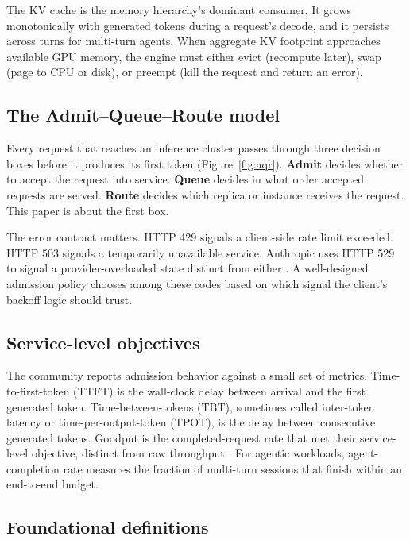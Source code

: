 \documentclass[11pt,letterpaper]{article}
\theoremstyle{definition}
\begin{document}
The KV cache is the memory hierarchy's dominant consumer. It grows
monotonically with generated tokens during a request's decode, and it
persists across turns for multi-turn agents. When aggregate KV
footprint approaches available GPU memory, the engine must either
evict (recompute later), swap (page to CPU or disk), or preempt (kill
the request and return an error).

\subsection{The Admit--Queue--Route model}

Every request that reaches an inference cluster passes through three
decision boxes before it produces its first token
(Figure~\ref{fig:aqr}). \textbf{Admit} decides whether to accept the
request into service. \textbf{Queue} decides in what order accepted
requests are served. \textbf{Route} decides which replica or instance
receives the request. This paper is about the first box.

The error contract matters. HTTP 429 signals a client-side rate limit
exceeded. HTTP 503 signals a temporarily unavailable service.
Anthropic uses HTTP 529 to signal a provider-overloaded state distinct
from either \cite{anthropic_api_errors}. A well-designed admission
policy chooses among these codes based on which signal the client's
backoff logic should trust.

\subsection{Service-level objectives}

The community reports admission behavior against a small set of
metrics. Time-to-first-token (TTFT) is the wall-clock delay between
arrival and the first generated token. Time-between-tokens (TBT),
sometimes called inter-token latency or time-per-output-token (TPOT),
is the delay between consecutive generated tokens. Goodput is the
completed-request rate that met their service-level objective, distinct
from raw throughput \cite{zhong2024distserve}. For agentic workloads,
agent-completion rate measures the fraction of multi-turn sessions
that finish within an end-to-end budget.

\subsection{Foundational definitions}
\label{sec:defs}
\end{document}
